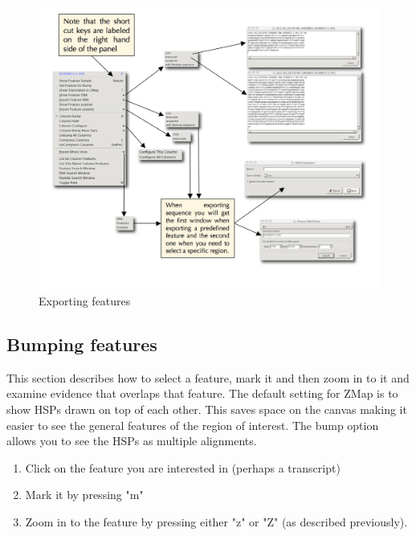 \documentclass[letterpaper]{article}
\begin{document}
\begin{figure}
\centering
\color[rgb]{0.30980393,0.5058824,0.7411765}
\includegraphics[width=15.231cm]{img_exporting_features.png}
\caption{Exporting features}
\label{img_exporting_features}
\end{figure}


\subsection{Bumping features}
This section describes how to select a feature, mark it and then zoom in to it and examine evidence that overlaps that feature. The default setting for ZMap is to show HSPs drawn on top of each other. This saves space on the canvas making it easier to see the general features of the region of interest. The bump option allows you to see the HSPs as multiple alignments.
\begin{enumerate}
\item Click on the feature you are interested in (perhaps a transcript)
\item Mark it by pressing "m"
\item Zoom in to the feature by pressing either "z" or "Z" (as described previously).
\end{enumerate}
\end{document}
